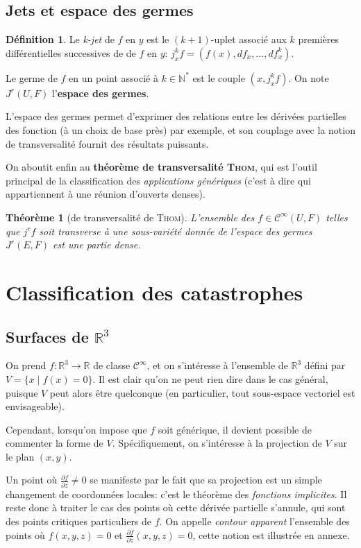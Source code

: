 \documentclass{article}
\newcommand{\cinf}{\mathcal{C}^\infty}
\newcommand{\R}{\mathbb{R}}
\newcommand{\N}{\mathbb{N}}
\newtheorem{thm}{Théorème}
\theoremstyle{definition}
\newtheorem{defn}{Définition}
\begin{document}
\subsection{Jets et espace des germes}

\begin{defn}
	Le \textit{k-jet} de $f$ en $y$ est le $(k+1)$-uplet associé aux $k$ premières différentielles successives de de $f$ en $y$: $j^k_x f = \left(f(x), df_x, ..., df^k_x\right)$.

	Le germe de $f$ en un point associé à $k\in\N^*$ est le couple $(x,j^k_x f)$. On note $J^r(U,F)$ l'\textbf{espace des germes}.
\end{defn}

L'espace des germes permet d'exprimer des relations entre les dérivées partielles des fonction (à un choix de base près) par exemple, et son couplage avec la notion de transversalité fournit des résultats puissants.

On aboutit enfin au \textbf{théorème de transversalité \textsc{Thom}}, qui est l'outil principal de la classification des \textit{applications génériques} (c'est à dire qui appartiennent à une réunion d'ouverts denses).

\begin{thm}[de transversalité de \textsc{Thom}]
	L'ensemble des $f\in\cinf(U,F)$ telles que $j^rf$ soit transverse à une sous-variété donnée de l'espace des germes $J^r(E,F)$ est une partie dense.
\end{thm}

\section{Classification des catastrophes}
\subsection{Surfaces de $\R^3$}

On prend $f: \R^3\to\R$ de classe $\cinf$, et on s'intéresse à l'ensemble de $\R^3$ défini par $V=\{x\mid f(x)=0\}$.
Il est clair qu'on ne peut rien dire dans le cas général, puisque $V$ peut alors être quelconque (en particulier, tout sous-espace vectoriel est envisageable).

Cependant, lorsqu'on impose que $f$ soit générique, il devient possible de commenter la forme de $V$.
Spécifiquement, on s'intéresse à la projection de $V$ sur le plan $(x,y)$.

Un point où $\frac{\partial f}{\partial z}\neq 0$ se manifeste par le fait que sa projection est un simple changement de coordonnées locales: c'est le théorème des \textit{fonctions implicites}.
Il reste donc à traiter le cas des points où cette dérivée partielle s'annule, qui sont des points critiques particuliers de $f$.
On appelle \textit{contour apparent} l'ensemble des points où $f(x,y,z)=0$ et $\frac{\partial f}{\partial z}(x,y,z)=0$, cette notion est illustrée en annexe.
\end{document}
